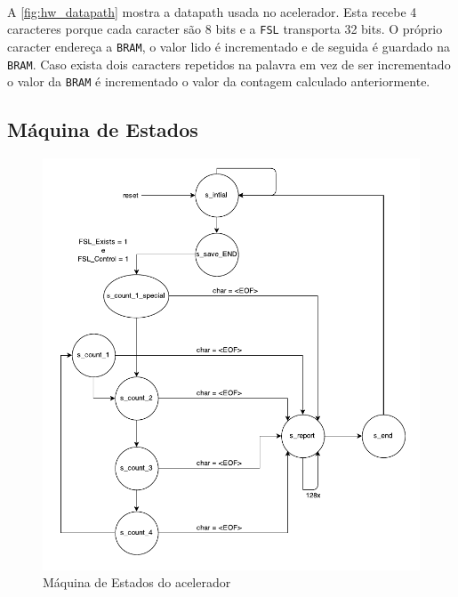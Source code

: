 \documentclass[a4paper]{article}
\begin{document}
  \paragraph{} A \autoref{fig:hw_datapath} mostra a datapath usada no acelerador. Esta recebe 4 caracteres porque cada caracter são 8 bits e a \texttt{FSL} transporta 32 bits. O próprio caracter endereça a \texttt{BRAM}, o valor lido é incrementado e de seguida é guardado na \texttt{BRAM}. Caso exista dois caracters repetidos na palavra em vez de ser incrementado o valor da \texttt{BRAM} é incrementado o valor da contagem calculado anteriormente.

  \subsection{Máquina de Estados}
	\begin{figure}[H]
		\centering
		\includegraphics[width=1.0\textwidth]{img/fsm}
		\caption{Máquina de Estados do acelerador}
		\label{fig:hw_fsm}
	\end{figure}

  \paragraph{}
\end{document}
